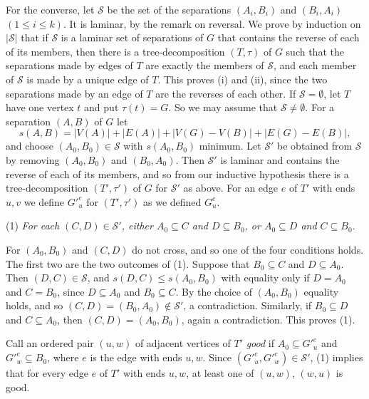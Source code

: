 {For the converse, let $\mathscr{S}$ be the set of the separations $(A_i, B_i)$ and $(B_i, A_i)$ $(1 \le i \le k)$. It is laminar, by the remark on reversal. We prove by induction on $|\mathscr{S}|$ that if $\mathscr{S}$ is a laminar set of separations of $G$ that contains the reverse of each of its members, then there is a tree-decomposition $(T, \tau)$ of $G$ such that the separations made by edges of $T$ are exactly the members of $\mathscr{S}$, and each member of $\mathscr{S}$ is made by a unique edge of $T$. This proves (i) and (ii), since the two separations made by an edge of $T$ are the reverses of each other. If $\mathscr{S} = \emptyset$, let $T$ have one vertex $t$ and put $\tau(t) = G$. So we may assume that $\mathscr{S} \ne \emptyset$. For a separation $(A, B)$ of $G$ let
\begin{equation*}
s(A, B) = |V(A)| + |E(A)| + |V(G) - V(B)| + |E(G) - E(B)|,
\end{equation*}
and choose $(A_0, B_0) \in \mathscr{S}$ with $s(A_0, B_0)$ minimum. Let $\mathscr{S}'$ be obtained from $\mathscr{S}$ by removing $(A_0, B_0)$ and $(B_0, A_0)$. Then $\mathscr{S}'$ is laminar and contains the reverse of each of its members, and so from our inductive hypothesis there is a tree-decomposition $(T', \tau')$ of $G$ for $\mathscr{S}'$ as above. For an edge $e$ of $T'$ with ends $u, v$ we define $G'^e_u$ for $(T', \tau')$ as we defined $G^e_u$.

\hspace*{12pt}(1) \textit{For each $(C, D) \in \mathscr{S}'$, either $A_0 \subseteq C$ and $D \subseteq B_0$, or $A_0 \subseteq D$ and $C \subseteq B_0$.}

For $(A_0, B_0)$ and $(C, D)$ do not cross, and so one of the four conditions holds. The first two are the two outcomes of (1). Suppose that $B_0 \subseteq C$ and $D \subseteq A_0$. Then $(D, C) \in \mathscr{S}$, and $s(D, C) \le s(A_0, B_0)$ with equality only if $D = A_0$ and $C = B_0$, since $D \subseteq A_0$ and $B_0 \subseteq C$. By the choice of $(A_0, B_0)$ equality holds, and so $(C, D) = (B_0, A_0) \notin \mathscr{S}'$, a contradiction. Similarly, if $B_0 \subseteq D$ and $C \subseteq A_0$, then $(C, D) = (A_0, B_0)$, again a contradiction. This proves (1).

Call an ordered pair $(u, w)$ of adjacent vertices of $T'$ \textit{good} if $A_0 \subseteq G'^e_u$ and $G'^e_w \subseteq B_0$, where $e$ is the edge with ends $u, w$. Since $(G'^e_u, G'^e_w) \in \mathscr{S}'$, (1) implies that for every edge $e$ of $T'$ with ends $u, w$, at least one of $(u, w)$, $(w, u)$ is good.

}

